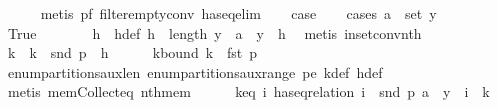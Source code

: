 \begin{isabellebody}
\ \ \ \ \isamarkupfalse%
\ {\isacharparenleft}{\kern0pt}metis\ p{}{\isacharunderscore}{\kern0pt}f{}\ filter{\isacharunderscore}{\kern0pt}empty{\isacharunderscore}{\kern0pt}conv\ has{\isacharunderscore}{\kern0pt}eq{\isacharunderscore}{\kern0pt}elim{\isacharparenright}{\kern0pt}\isanewline
\ \ \isamarkupfalse%
\ {\isacharquery}{\kern0pt}case\isanewline
\ \ \isamarkupfalse%
\ {\isacharparenleft}{\kern0pt}cases\ {\isachardoublequoteopen}a\ {\isasymin}\ set\ y{\isachardoublequoteclose}{\isacharparenright}{\kern0pt}\isanewline
\ \ \ \ \isamarkupfalse%
\ True\isanewline
\ \ \ \ \isamarkupfalse%
\ \isamarkupfalse%
\ h\ \ h{\isacharunderscore}{\kern0pt}def{\isacharcolon}{\kern0pt}\ {\isachardoublequoteopen}h\ {\isacharless}{\kern0pt}\ length\ y\ {\isasymand}\ a\ {\isacharequal}{\kern0pt}\ y\ {\isacharbang}{\kern0pt}\ h{\isachardoublequoteclose}\ \isamarkupfalse%
\ {\isacharparenleft}{\kern0pt}metis\ in{\isacharunderscore}{\kern0pt}set{\isacharunderscore}{\kern0pt}conv{\isacharunderscore}{\kern0pt}nth{\isacharparenright}{\kern0pt}\isanewline
\ \ \ \ \isamarkupfalse%
\ k\ \ {\isachardoublequoteopen}k\ {\isacharequal}{\kern0pt}\ snd\ p{}\ {\isacharbang}{\kern0pt}\ h{\isachardoublequoteclose}\isanewline
\ \ \ \ \isamarkupfalse%
\ k{\isacharunderscore}{\kern0pt}bound{\isacharcolon}{\kern0pt}\ {\isachardoublequoteopen}k\ {\isacharless}{\kern0pt}\ fst\ p{}{\isachardoublequoteclose}\isanewline
\ \ \ \ \ \ \isamarkupfalse%
\ enum{\isacharunderscore}{\kern0pt}partitions{\isacharunderscore}{\kern0pt}aux{\isacharunderscore}{\kern0pt}len\ enum{\isacharunderscore}{\kern0pt}partitions{\isacharunderscore}{\kern0pt}aux{\isacharunderscore}{\kern0pt}range\ p{}{\isacharunderscore}{\kern0pt}e\ k{\isacharunderscore}{\kern0pt}def\ h{\isacharunderscore}{\kern0pt}def\ \isanewline
\ \ \ \ \ \ \isamarkupfalse%
\ {\isacharparenleft}{\kern0pt}metis\ mem{\isacharunderscore}{\kern0pt}Collect{\isacharunderscore}{\kern0pt}eq\ nth{\isacharunderscore}{\kern0pt}mem{\isacharparenright}{\kern0pt}\isanewline
\ \ \ \ \isamarkupfalse%
\ k{\isacharunderscore}{\kern0pt}eq{\isacharcolon}{\kern0pt}\ {\isachardoublequoteopen}{\isasymAnd}i{\isachardot}{\kern0pt}\ has{\isacharunderscore}{\kern0pt}eq{\isacharunderscore}{\kern0pt}relation\ {\isacharparenleft}{\kern0pt}i\ {\isacharhash}{\kern0pt}\ snd\ p{}{\isacharparenright}{\kern0pt}\ {\isacharparenleft}{\kern0pt}a\ {\isacharhash}{\kern0pt}\ y{\isacharparenright}{\kern0pt}\ {\isacharequal}{\kern0pt}\ {\isacharparenleft}{\kern0pt}i\ {\isacharequal}{\kern0pt}\ k{\isacharparenright}{\kern0pt}{\isachardoublequoteclose}\ \isanewline

\end{isabellebody}
